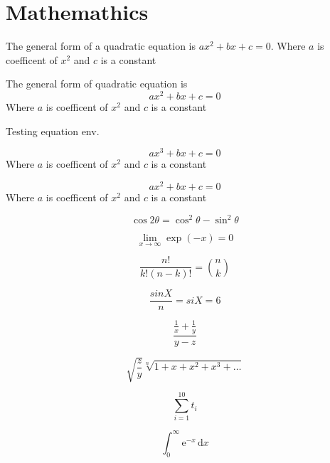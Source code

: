 \documentclass{report}
\begin{document}
\chapter{Mathemathics}

The general form of a quadratic equation is $ax^2+bx+c=0$. Where  $a$ is coefficent of $x^2$ and $c$ is a constant

The general form of quadratic equation is 
\begin{displaymath}
	ax^2+bx+c=0
\end{displaymath}
Where  $a$ is coefficent of $x^2$ and $c$ is a constant


Testing equation env.

\begin{equation}
	ax^3+bx+c=0
\end{equation}
Where  $a$ is coefficent of $x^2$ and $c$ is a constant


\begin{equation}
	ax^2+bx+c=0
\end{equation}
Where  $a$ is coefficent of $x^2$ and $c$ is a constant



\begin{equation}
	\cos 2\theta = \cos^2\theta - \sin^2\theta
\end{equation}

\begin{equation}
	\lim_{x \to \infty} \exp(-x) = 0
\end{equation}

\begin{equation}
	\frac{n!}{k!(n-k)!} = \binom{n}{k} 
\end{equation}

\begin{equation}
	\frac{sinX}{n} = siX = 6
\end{equation}

\begin{equation}
	\frac{\frac{1}{x}+\frac{1}{y}}{y-z}
\end{equation}

\begin{equation}
	\sqrt{\frac{z}{y}}
	\sqrt[n]{1+x+x^2+x^3+\ldots}
\end{equation}

\begin{equation}
	\sum_{i=1}^{10} t_i
\end{equation}

\begin{equation}
	\int_0^\infty \mathrm{e}^{-x}\,\mathrm{d}x
\end{equation}
\end{document}
